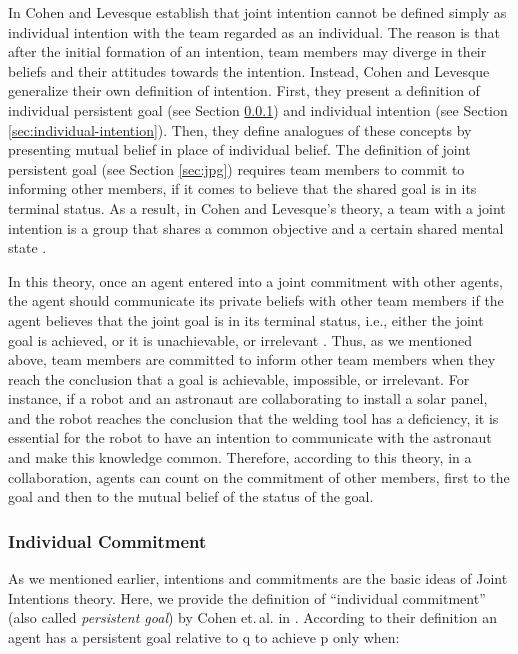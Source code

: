 \documentclass[12pt]{report}
\begin{document}
In \cite{cohen:teamwork} Cohen and Levesque establish that joint intention
cannot be defined simply as individual intention with the team regarded as an
individual. The reason is that after the initial formation of an intention, team
members may diverge in their beliefs and their attitudes towards the intention.
Instead, Cohen and Levesque generalize their own definition of intention. First,
they present a definition of individual persistent goal (see Section
\ref{sec:individual-commitment}) and individual intention (see Section
\ref{sec:individual-intention}). Then, they define analogues of these concepts
by presenting mutual belief in place of individual belief. The definition of
joint persistent goal (see Section \ref{sec:jpg}) requires team members to
commit to informing other members, if it comes to believe that the shared goal
is in its terminal status. As a result, in Cohen and Levesque's theory, a team
with a joint intention is a group that shares a common objective and a certain
shared mental state \cite{jarvis:teams-multiagent-systems}.

In this theory, once an agent entered into a joint commitment with other agents,
the agent should communicate its private beliefs with other team members if the
agent believes that the joint goal is in its terminal status, i.e., either the
joint goal is achieved, or it is unachievable, or irrelevant
\cite{wilsker:study-theories}. Thus, as we mentioned above, team members are
committed to inform other team members when they reach the conclusion that a
goal is achievable, impossible, or irrelevant. For instance, if a robot and an
astronaut are collaborating to install a solar panel, and the robot reaches the
conclusion that the welding tool has a deficiency, it is essential for the robot
to have an intention to communicate with the astronaut and make this knowledge
common. Therefore, according to this theory, in a collaboration, agents can
count on the commitment of other members, first to the goal and then to the
mutual belief of the status of the goal.

\subsubsection{Individual Commitment}
\label{sec:individual-commitment}

As we mentioned earlier, intentions and commitments are the basic ideas of Joint
Intentions theory. Here, we provide the definition of ``individual commitment''
(also called \textit{persistent goal}) by Cohen et.\,al. in
\cite{cohen:team-formation}. According to their definition an agent has a
persistent goal relative to q to achieve p only when:
\end{document}
